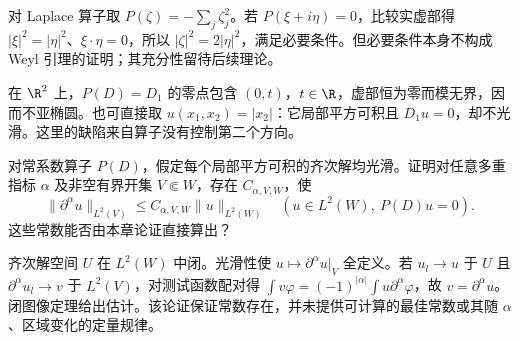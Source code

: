 \begin{example}
对 Laplace 算子取 $P(\zeta)=-\sum_j\zeta_j^2$。若 $P(\xi+i\eta)=0$，比较实虚部得 $|\xi|^2=|\eta|^2$、$\xi\cdot\eta=0$，所以 $|\zeta|^2=2|\eta|^2$，满足必要条件。但必要条件本身不构成 Weyl 引理的证明；其充分性留待后续理论。

在 $\R^2$ 上，$P(D)=D_1$ 的零点包含 $(0,t)$，$t\in\R$，虚部恒为零而模无界，因而不亚椭圆。也可直接取 $u(x_1,x_2)=|x_2|$：它局部平方可积且 $D_1u=0$，却不光滑。这里的缺陷来自算子没有控制第二个方向。
\end{example}

\begin{exercise}
对常系数算子 $P(D)$，假定每个局部平方可积的齐次解均光滑。证明对任意多重指标 $\alpha$ 及非空有界开集 $V\Subset W$，存在 $C_{\alpha,V,W}$，使
\[
 \|\partial^\alpha u\|_{L^2(V)}\le C_{\alpha,V,W}\|u\|_{L^2(W)}
 \quad(u\in L^2(W),\ P(D)u=0).
\]
这些常数能否由本章论证直接算出？
\end{exercise}
\begin{solution}
齐次解空间 $U$ 在 $L^2(W)$ 中闭。光滑性使 $u\mapsto\partial^\alpha u|_V$ 全定义。若 $u_l\to u$ 于 $U$ 且 $\partial^\alpha u_l\to v$ 于 $L^2(V)$，对测试函数配对得 $\int v\varphi=(-1)^{|\alpha|}\int u\partial^\alpha\varphi$，故 $v=\partial^\alpha u$。闭图像定理给出估计。该论证保证常数存在，并未提供可计算的最佳常数或其随 $\alpha$、区域变化的定量规律。
\end{solution}
